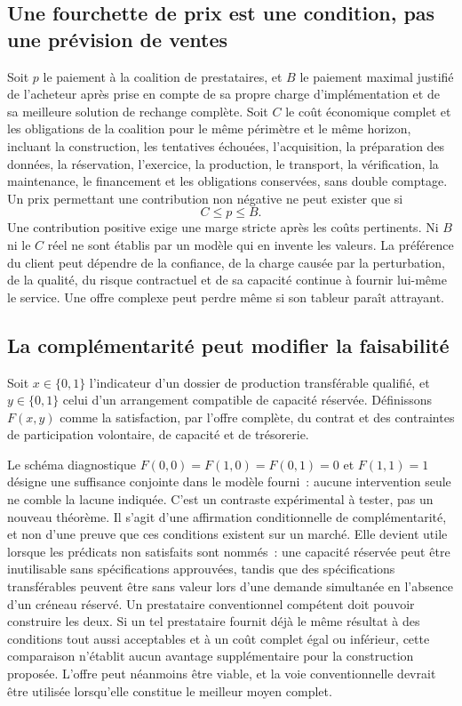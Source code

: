 \documentclass[11pt,a4paper]{article}
\begin{document}
\subsection{Une fourchette de prix est une condition, pas une prévision de ventes}
Soit $p$ le paiement à la coalition de prestataires, et $B$ le paiement maximal justifié de l’acheteur après prise en compte de sa propre charge d’implémentation et de sa meilleure solution de rechange complète. Soit $C$ le coût économique complet et les obligations de la coalition pour le même périmètre et le même horizon, incluant la construction, les tentatives échouées, l’acquisition, la préparation des données, la réservation, l’exercice, la production, le transport, la vérification, la maintenance, le financement et les obligations conservées, sans double comptage. Un prix permettant une contribution non négative ne peut exister que si
\begin{equation}
C\leq p\leq B.
\end{equation}
Une contribution positive exige une marge stricte après les coûts pertinents. Ni $B$ ni le $C$ réel ne sont établis par un modèle qui en invente les valeurs. La préférence du client peut dépendre de la confiance, de la charge causée par la perturbation, de la qualité, du risque contractuel et de sa capacité continue à fournir lui-même le service. Une offre complexe peut perdre même si son tableur paraît attrayant.

\subsection{La complémentarité peut modifier la faisabilité}
Soit $x\in\{0,1\}$ l’indicateur d’un dossier de production transférable qualifié, et $y\in\{0,1\}$ celui d’un arrangement compatible de capacité réservée. Définissons $F(x,y)$ comme la satisfaction, par l’offre complète, du contrat et des contraintes de participation volontaire, de capacité et de trésorerie.

Le schéma diagnostique $F(0,0)=F(1,0)=F(0,1)=0$ et $F(1,1)=1$ désigne une suffisance conjointe dans le modèle fourni~: aucune intervention seule ne comble la lacune indiquée. C’est un contraste expérimental à tester, pas un nouveau théorème.
Il s’agit d’une affirmation conditionnelle de complémentarité, et non d’une preuve que ces conditions existent sur un marché. Elle devient utile lorsque les prédicats non satisfaits sont nommés~: une capacité réservée peut être inutilisable sans spécifications approuvées, tandis que des spécifications transférables peuvent être sans valeur lors d’une demande simultanée en l’absence d’un créneau réservé. Un prestataire conventionnel compétent doit pouvoir construire les deux. Si un tel prestataire fournit déjà le même résultat à des conditions tout aussi acceptables et à un coût complet égal ou inférieur, cette comparaison n’établit aucun avantage supplémentaire pour la construction proposée. L’offre peut néanmoins être viable, et la voie conventionnelle devrait être utilisée lorsqu’elle constitue le meilleur moyen complet.
\end{document}
